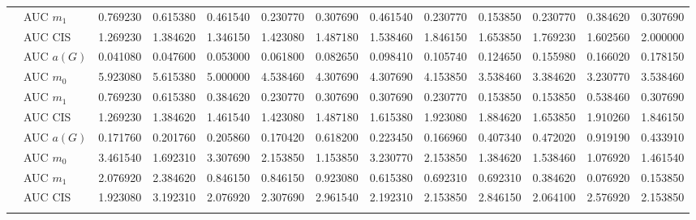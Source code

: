 \begin{table}[htbp]
\begin{tabular}{llrrrrrrrrrrr}
    & AUC $m_1$ & 0.769230 & 0.615380 & 0.461540 & 0.230770 & 0.307690 & 0.461540 & 0.230770 & 0.153850 & 0.230770 & 0.384620 & 0.307690 \\
    & AUC CIS & 1.269230 & 1.384620 & 1.346150 & 1.423080 & 1.487180 & 1.538460 & 1.846150 & 1.653850 & 1.769230 & 1.602560 & 2.000000 \\
    \addlinespace
    \multirow{4}{*}{degree} & AUC $a(G)$ & 0.041080 & 0.047600 & 0.053000 & 0.061800 & 0.082650 & 0.098410 & 0.105740 & 0.124650 & 0.155980 & 0.166020 & 0.178150 \\
    & AUC $m_0$ & 5.923080 & 5.615380 & 5.000000 & 4.538460 & 4.307690 & 4.307690 & 4.153850 & 3.538460 & 3.384620 & 3.230770 & 3.538460 \\
    & AUC $m_1$ & 0.769230 & 0.615380 & 0.384620 & 0.230770 & 0.307690 & 0.307690 & 0.230770 & 0.153850 & 0.153850 & 0.538460 & 0.307690 \\
    & AUC CIS & 1.269230 & 1.384620 & 1.461540 & 1.423080 & 1.487180 & 1.615380 & 1.923080 & 1.884620 & 1.653850 & 1.910260 & 1.846150 \\
    \addlinespace
    \multirow{4}{*}{random} & AUC $a(G)$ & 0.171760 & 0.201760 & 0.205860 & 0.170420 & 0.618200 & 0.223450 & 0.166960 & 0.407340 & 0.472020 & 0.919190 & 0.433910 \\
    & AUC $m_0$ & 3.461540 & 1.692310 & 3.307690 & 2.153850 & 1.153850 & 3.230770 & 2.153850 & 1.384620 & 1.538460 & 1.076920 & 1.461540 \\
    & AUC $m_1$ & 2.076920 & 2.384620 & 0.846150 & 0.846150 & 0.923080 & 0.615380 & 0.692310 & 0.692310 & 0.384620 & 0.076920 & 0.153850 \\
    & AUC CIS & 1.923080 & 3.192310 & 2.076920 & 2.307690 & 2.961540 & 2.192310 & 2.153850 & 2.846150 & 2.064100 & 2.576920 & 2.153850 \\
    \addlinespace
    \bottomrule
  \end{tabular}
\end{table}

